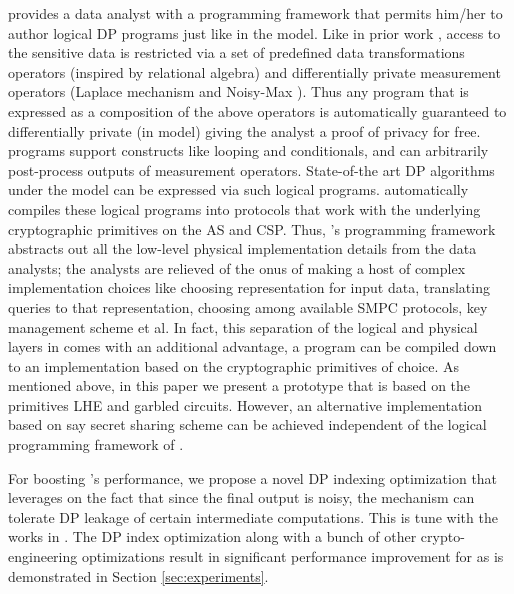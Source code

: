  \system provides a data analyst with a programming framework  that permits him/her to author logical DP programs just like in the \cdp model.  Like in prior work \cite{PINQ, FWPINQ, ektelo}, access to the sensitive data is restricted via a set of predefined data transformations operators (inspired by relational algebra) and differentially private measurement operators (Laplace mechanism and Noisy-Max \cite{Dork}). Thus any program that is expressed as a composition of the above operators is automatically guaranteed to differentially private (in \cdp model) giving the analyst a proof of privacy for free. \system programs support constructs like looping and conditionals, and can arbitrarily post-process outputs of measurement operators. State-of-the art DP algorithms under the \cdp model can be  expressed via such logical programs. \system automatically compiles these logical programs into \system protocols that work with the underlying cryptographic primitives on the \textsf{AS} and \textsf{CSP}. Thus, \system's programming framework abstracts out all the low-level physical implementation details from the data analysts; the analysts are relieved of the onus of making a host of complex implementation choices like choosing representation for input data, translating queries to that representation, choosing among available SMPC protocols, key management scheme et al. In fact, this separation of the logical and physical layers in \system comes with an additional advantage, a \system program can be compiled down to an implementation based on the cryptographic primitives of choice. As mentioned above, in this paper we present a prototype \system that is based on the primitives LHE and garbled circuits. However, an alternative implementation based on say secret sharing scheme can be achieved independent of the logical programming framework of \system.
 
For boosting \system's performance, we propose a novel DP indexing optimization that leverages on the fact that since the final output is noisy, the mechanism can tolerate DP leakage of certain intermediate computations. This is tune with the works in \cite{Mazloom:2018:SCD,He:2017:RecordLinkage,Chan:2019:FDO:3310435.3310585,Groce}. The DP index optimization along with a bunch of other crypto-engineering optimizations result in significant performance improvement for \system as is demonstrated in Section \ref{sec:experiments}.  

